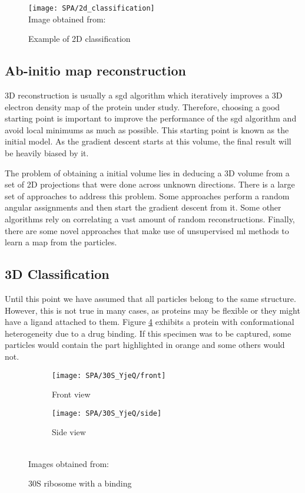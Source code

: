 \documentclass[../main.tex]{subfiles}
\begin{document}
\begin{figure}[htbp]
    \centering
    \texttt{[image: SPA/2d\_classification]}\\
    Image obtained from: \cite{greg}
    \caption{Example of 2D classification}
    \label{fig:2:2d_classification}
\end{figure}

\subsection{Ab-initio map reconstruction}
3D reconstruction is usually a \gls{sgd} algorithm which iteratively improves a 3D electron density map of the protein under study. Therefore, choosing a good starting point is important to improve the performance of the \gls{sgd} algorithm and avoid local minimums as much as possible. This starting point is known as the initial model. As the gradient descent starts at this volume, the final result will be heavily biased by it\cite{sigworth2015}.

The problem of obtaining a initial volume lies in deducing a 3D volume from a set of 2D projections that were done across unknown directions. There is a large set of approaches to address this problem. Some approaches perform a random angular assignments and then start the gradient descent from it. Some other algorithms rely on correlating a vast amount of random reconstructions\cite{vargas2014}. Finally, there are some novel approaches that make use of unsupervised \gls{ml} methods to learn a map from the particles\cite{levy2022}.

\subsection{3D Classification}
Until this point we have assumed that all particles belong to the same structure. However, this is not true in many cases, as proteins may be flexible or they might have a ligand attached to them. Figure \ref{fig:2:30s_yjeq} exhibits a protein with conformational heterogeneity due to a drug binding. If this specimen was to be captured, some particles would contain the part highlighted in orange and some others would not.

\begin{figure}[htbp]
    \centering
    \begin{subfigure}[b]{0.3\textwidth}
         \centering
         \texttt{[image: SPA/30S\_YjeQ/front]}
         \caption{Front view}
         \label{fig:2:30s_yjeq:front}
    \end{subfigure}
    \begin{subfigure}[b]{0.3\textwidth}
         \centering
         \texttt{[image: SPA/30S\_YjeQ/side]}
         \caption{Side view}
         \label{fig:2:30s_yjeq:side}
    \end{subfigure}\\
    Images obtained from: \cite{razi2017}
    \caption{30S ribosome with a binding}
    \label{fig:2:30s_yjeq}
\end{figure}
\end{document}
